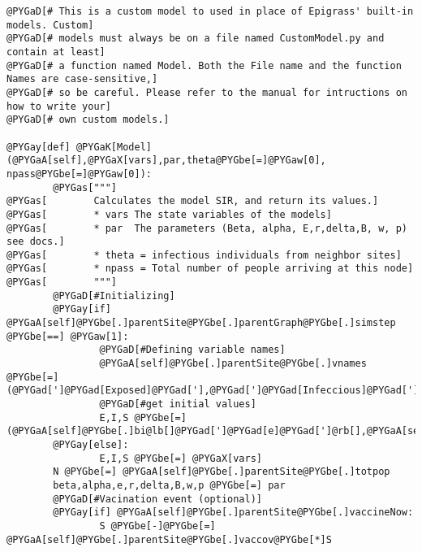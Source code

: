 \documentclass[a4paper,10pt]{manual}
\begin{document}
\begin{Verbatim}[commandchars=@\[\]]
@PYGaD[# This is a custom model to used in place of Epigrass' built-in models. Custom]
@PYGaD[# models must always be on a file named CustomModel.py and contain at least]
@PYGaD[# a function named Model. Both the File name and the function Names are case-sensitive,]
@PYGaD[# so be careful. Please refer to the manual for intructions on how to write your]
@PYGaD[# own custom models.]

@PYGay[def] @PYGaK[Model](@PYGaA[self],@PYGaX[vars],par,theta@PYGbe[=]@PYGaw[0], npass@PYGbe[=]@PYGaw[0]):
        @PYGas["""]
@PYGas[        Calculates the model SIR, and return its values.]
@PYGas[        * vars The state variables of the models]
@PYGas[        * par  The parameters (Beta, alpha, E,r,delta,B, w, p) see docs.]
@PYGas[        * theta = infectious individuals from neighbor sites]
@PYGas[        * npass = Total number of people arriving at this node]
@PYGas[        """]
        @PYGaD[#Initializing]
        @PYGay[if] @PYGaA[self]@PYGbe[.]parentSite@PYGbe[.]parentGraph@PYGbe[.]simstep @PYGbe[==] @PYGaw[1]:
                @PYGaD[#Defining variable names]
                @PYGaA[self]@PYGbe[.]parentSite@PYGbe[.]vnames @PYGbe[=] (@PYGad[']@PYGad[Exposed]@PYGad['],@PYGad[']@PYGad[Infeccious]@PYGad['],@PYGad[']@PYGad[Susceptible]@PYGad['])
                @PYGaD[#get initial values]
                E,I,S @PYGbe[=] (@PYGaA[self]@PYGbe[.]bi@lb[]@PYGad[']@PYGad[e]@PYGad[']@rb[],@PYGaA[self]@PYGbe[.]bi@lb[]@PYGad[']@PYGad[i]@PYGad[']@rb[],@PYGaA[self]@PYGbe[.]bi@lb[]@PYGad[']@PYGad[s]@PYGad[']@rb[])
        @PYGay[else]:
                E,I,S @PYGbe[=] @PYGaX[vars]
        N @PYGbe[=] @PYGaA[self]@PYGbe[.]parentSite@PYGbe[.]totpop
        beta,alpha,e,r,delta,B,w,p @PYGbe[=] par
        @PYGaD[#Vacination event (optional)]
        @PYGay[if] @PYGaA[self]@PYGbe[.]parentSite@PYGbe[.]vaccineNow:
                S @PYGbe[-]@PYGbe[=] @PYGaA[self]@PYGbe[.]parentSite@PYGbe[.]vaccov@PYGbe[*]S


\end{Verbatim}
\end{document}
